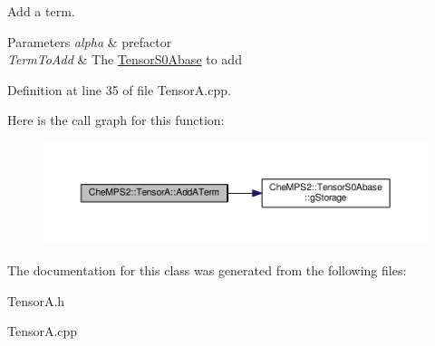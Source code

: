 Add a term. 


\begin{DoxyParams}{Parameters}
{\em alpha} & prefactor \\
\hline
{\em Term\-To\-Add} & The \hyperlink{classCheMPS2_1_1TensorS0Abase}{Tensor\-S0\-Abase} to add \\
\hline
\end{DoxyParams}


Definition at line 35 of file Tensor\-A.\-cpp.



Here is the call graph for this function\-:\nopagebreak
\begin{figure}[H]
\begin{center}
\leavevmode
\includegraphics[width=350pt]{classCheMPS2_1_1TensorA_aa007e07e253c3dc8ceaf5b9592cd7371_cgraph}
\end{center}
\end{figure}




The documentation for this class was generated from the following files\-:\begin{DoxyCompactItemize}
\item 
Tensor\-A.\-h\item 
Tensor\-A.\-cpp\end{DoxyCompactItemize}
